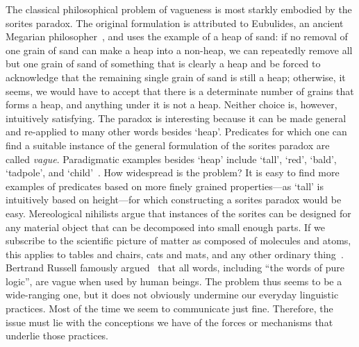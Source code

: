 \documentclass[a4paper]{article}
\begin{document}
The classical philosophical problem of vagueness is most starkly embodied by the sorites paradox.
The original formulation is attributed to Eubulides, an ancient Megarian philosopher~\parencite{sorensen_sorites_2009}, and uses the example of a heap of sand: if no removal of one grain of sand can make a heap into a non-heap, we can repeatedly remove all but one grain of sand of something that is clearly a heap and be forced to acknowledge that the remaining single grain of sand is still a heap; otherwise, it seems, we would have to accept that there is a determinate number of grains that forms a heap, and anything under it is not a heap.
Neither choice is, however, intuitively satisfying.
The paradox is interesting because it can be made general and re-applied to many other words besides `heap'.
Predicates for which one can find a suitable instance of the general formulation of the sorites paradox are called \emph{vague}.
Paradigmatic examples besides `heap' include `tall', `red', `bald', `tadpole', and `child'~\parencite{Keefe1997}.
How widespread is the problem?
It is easy to find more examples of predicates based on more finely grained properties---as `tall' is intuitively based on height---for which constructing a sorites paradox would be easy.
Mereological nihilists argue that instances of the sorites can be designed for any material object that can be decomposed into small enough parts.
If we subscribe to the scientific picture of matter as composed of molecules and atoms, this applies to tables and chairs, cats and mats, and any other ordinary thing~\parencite{Unger1979}.
Bertrand Russell famously argued~\parencite*{russell_vagueness_1923} that all words, including ``the words of pure logic'', are vague when used by human beings.
The problem thus seems to be a wide-ranging one, but it does not obviously undermine our everyday linguistic practices.
Most of the time we seem to communicate just fine.
Therefore, the issue must lie with the conceptions we have of the forces or mechanisms that underlie those practices.
\end{document}
